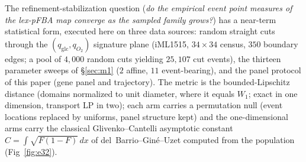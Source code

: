 \documentclass[11pt,a4paper]{article}
\theoremstyle{plain}
\theoremstyle{definition}
\theoremstyle{remark}
\begin{document}
The refinement-stabilization question
(\emph{do the empirical event point measures of the
lex-pFBA map converge as the sampled family grows?}) has a near-term statistical form, executed here on three data sources: random straight cuts through the $(q_{\mathrm{glc}}, q_{O_2})$ signature plane (iML1515, $34\times34$
census, $350$ boundary edges; a pool of $4{,}000$ random cuts
yielding $25{,}107$ cut events), the thirteen parameter sweeps of \S\ref{sec:m1} ($2$ affine, $11$ event-bearing), and the panel protocol of this paper (gene panel and trajectory). The metric is the bounded-Lipschitz
distance (domains normalized to unit diameter, where it equals
$W_1$; exact in one dimension, transport LP in two); each arm carries
a permutation null (event locations replaced by uniforms, panel
structure kept) and the one-dimensional arms carry the classical
Glivenko--Cantelli asymptotic constant
$C = \int\sqrt{F(1-F)}\,dx$ of del~Barrio--Gin\'e--Uzet computed from
the population (Fig~\ref{fig:e32}).
\end{document}
